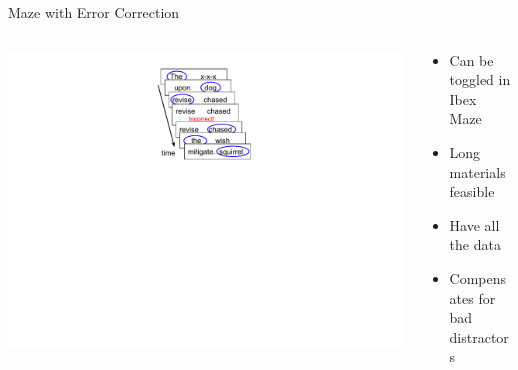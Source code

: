 \documentclass[12pt, xcolor=beamer,table,usenames,dvipsnames, ignorenonframetext, ngerman,t]{beamer}
\begin{document}
\begin{frame}{Maze with Error Correction}

\begin{columns}
	\begin{column}{0.4\textwidth}
		\begin{center}
		\includegraphics[clip, trim=9cm 12.5cm 10cm 1cm,width=\textwidth]{../maze_diagram.pdf}
		\end{center}
		
	\end{column} \pause 
	\begin{column}{0.6\textwidth} 
		\begin{center}
			\begin{itemize}
				\item Can be toggled in Ibex Maze \pause
				\item Long materials feasible \pause
				\item Have all the data \pause
				\item Compensates for bad distractors
			\end{itemize}
		\end{center}
	\end{column}
\end{columns}
\end{frame}
%
\end{document}
